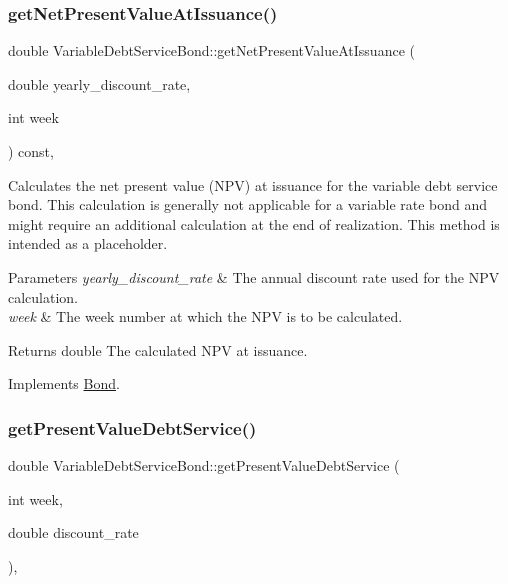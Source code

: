 \subsubsection{\texorpdfstring{get\+Net\+Present\+Value\+At\+Issuance()}{getNetPresentValueAtIssuance()}}
{\footnotesize\ttfamily double Variable\+Debt\+Service\+Bond\+::get\+Net\+Present\+Value\+At\+Issuance (\begin{DoxyParamCaption}\item[{double}]{yearly\+\_\+discount\+\_\+rate,  }\item[{int}]{week }\end{DoxyParamCaption}) const\hspace{0.3cm}{\ttfamily [override]}, {\ttfamily [virtual]}}



Calculates the net present value (N\+PV) at issuance for the variable debt service bond. This calculation is generally not applicable for a variable rate bond and might require an additional calculation at the end of realization. This method is intended as a placeholder. 


\begin{DoxyParams}{Parameters}
{\em yearly\+\_\+discount\+\_\+rate} & The annual discount rate used for the N\+PV calculation. \\
\hline
{\em week} & The week number at which the N\+PV is to be calculated.\\
\hline
\end{DoxyParams}
\begin{DoxyReturn}{Returns}
double The calculated N\+PV at issuance. 
\end{DoxyReturn}


Implements \mbox{\hyperlink{classBond_a5997278813deb16aa5d01bbca8ecc7b2}{Bond}}.

\mbox{\label{classVariableDebtServiceBond_aa5ad4fcc7c65154105388b332ae98198}} 
\subsubsection{\texorpdfstring{get\+Present\+Value\+Debt\+Service()}{getPresentValueDebtService()}}
{\footnotesize\ttfamily double Variable\+Debt\+Service\+Bond\+::get\+Present\+Value\+Debt\+Service (\begin{DoxyParamCaption}\item[{int}]{week,  }\item[{double}]{discount\+\_\+rate }\end{DoxyParamCaption})\hspace{0.3cm}{\ttfamily [override]}, {\ttfamily [virtual]}}



